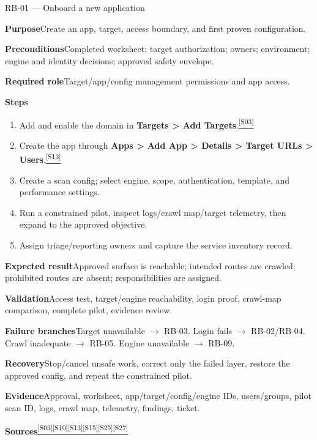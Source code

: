 \documentclass[11pt,letterpaper,oneside]{scrreprt}
\newcommand{\src}[1]{\hyperref[src:#1]{\textsuperscript{\color{R7Orange}[#1]}}}
\newcommand{\uipath}[1]{\textsf{\textbf{#1}}}
\newcommand{\field}[1]{\par\smallskip\noindent\textbf{#1}\quad}
\begin{document}
\begin{procedure}{RB-01 --- Onboard a new application}
\field{Purpose}Create an app, target, access boundary, and first proven configuration.
\field{Preconditions}Completed worksheet; target authorization; owners; environment; engine and identity decisions; approved safety envelope.
\field{Required role}Target/app/config management permissions and app access.
\field{Steps}
\begin{enumerate}
  \item Add and enable the domain in \uipath{Targets > Add Targets}.\src{S03}
  \item Create the app through \uipath{Apps > Add App > Details > Target URLs > Users}.\src{S13}
  \item Create a scan config; select engine, scope, authentication, template, and performance settings.
  \item Run a constrained pilot, inspect logs/crawl map/target telemetry, then expand to the approved objective.
  \item Assign triage/reporting owners and capture the service inventory record.
\end{enumerate}
\field{Expected result}Approved surface is reachable; intended routes are crawled; prohibited routes are absent; responsibilities are assigned.
\field{Validation}Access test, target/engine reachability, login proof, crawl-map comparison, complete pilot, evidence review.
\field{Failure branches}Target unavailable $\rightarrow$ RB-03. Login fails $\rightarrow$ RB-02/RB-04. Crawl inadequate $\rightarrow$ RB-05. Engine unavailable $\rightarrow$ RB-09.
\field{Recovery}Stop/cancel unsafe work, correct only the failed layer, restore the approved config, and repeat the constrained pilot.
\field{Evidence}Approval, worksheet, app/target/config/engine IDs, users/groups, pilot scan ID, logs, crawl map, telemetry, findings, ticket.
\field{Sources}\src{S03}\src{S10}\src{S13}\src{S15}\src{S25}\src{S27}
\end{procedure}
\end{document}
